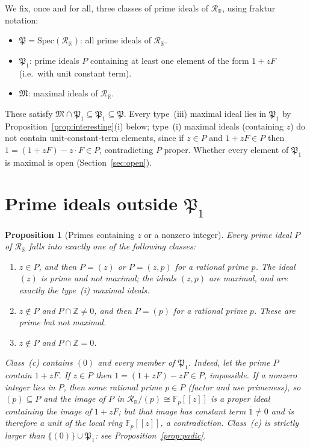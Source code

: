 \documentclass[12pt]{amsart}
\newtheorem{proposition}[theorem]{Proposition}
\theoremstyle{definition}
\newcommand{\Z}{\mathbb{Z}}
\newcommand{\mRR}{\mathcal{R}_{\mathbb{R}}}
\begin{document}
We fix, once and for all, three classes of prime ideals of $\mRR$,
using fraktur notation:
\begin{itemize}
\item $\mathfrak{P} = \mathrm{Spec}(\mRR)$: all prime ideals of $\mRR$.
\item $\mathfrak{P}_1$: prime ideals $P$ containing at least one element
  of the form $1 + zF$ (i.e.\ with unit constant term).
\item $\mathfrak{M}$: maximal ideals of $\mRR$.
\end{itemize}
These satisfy $\mathfrak{M} \cap \mathfrak{P}_1 \subseteq \mathfrak{P}_1
\subseteq \mathfrak{P}$.  Every type~(iii) maximal ideal lies in
$\mathfrak{P}_1$ by Proposition~\ref{prop:interesting}(i) below;
type~(i) maximal ideals (containing $z$) do not contain
unit-constant-term elements, since if $z \in P$ and $1 + zF \in P$ then
$1 = (1 + zF) - z \cdot F \in P$, contradicting $P$ proper.  Whether
every element of $\mathfrak{P}_1$ is maximal is open
(Section~\ref{sec:open}).

\section{Prime ideals outside $\mathfrak{P}_1$}
\label{sec:outside}

\begin{proposition}[Primes containing $z$ or a nonzero integer]
\label{prop:primes_outside}
Every prime ideal $P$ of $\mRR$ falls into exactly one of the following
classes:
\begin{enumerate}
\item[(a)] $z \in P$, and then $P = (z)$ or $P = (z, p)$ for a rational
  prime $p$.  The ideal $(z)$ is prime and not maximal; the ideals
  $(z,p)$ are maximal, and are exactly the type~(i) maximal ideals.
\item[(b)] $z \notin P$ and $P \cap \Z \neq 0$, and then $P = (p)$ for a
  rational prime $p$.  These are prime but not maximal.
\item[(c)] $z \notin P$ and $P \cap \Z = 0$.
\end{enumerate}
Class~(c) contains $(0)$ and every member of $\mathfrak{P}_1$.  Indeed,
let the prime $P$ contain $1 + zF$.  If $z \in P$ then $1 = (1+zF) -
zF \in P$, impossible.  If a nonzero integer lies in $P$, then some
rational prime $p \in P$ (factor and use primeness), so $(p) \subseteq
P$ and the image of $P$ in $\mRR/(p) \cong \mathbb{F}_p[[z]]$ is a
proper ideal containing the image of $1 + zF$; but that image has
constant term $\bar 1 \neq 0$ and is therefore a unit of the local ring
$\mathbb{F}_p[[z]]$, a contradiction.  Class~(c) is strictly larger than
$\{(0)\} \cup \mathfrak{P}_1$: see Proposition~\ref{prop:padic}.
\end{proposition}
\end{document}
